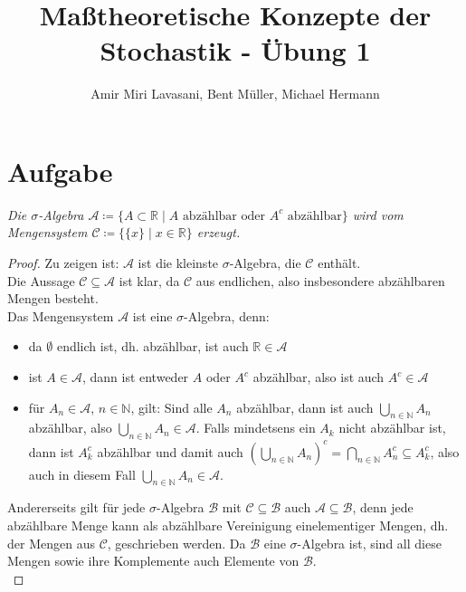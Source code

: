 \documentclass[11pt]{amsart}
\title{Maßtheoretische Konzepte der Stochastik - Übung 1}
\author{Amir Miri Lavasani, Bent Müller, Michael Hermann}
\begin{document}
\maketitle

\pagestyle{empty}

\section{Aufgabe}
\thispagestyle{empty}
\textit{Die $\sigma$-Algebra $\mathcal{A} \coloneqq \{A \subset \mathbb{R} \;|\; A \text{ abzählbar oder } A^c \text{ abzählbar}\}$ wird vom Mengensystem  $\mathcal{C} \coloneqq  \{\{x\} \;|\; x \in \mathbb{R}\}$ erzeugt.}
\begin{proof}
Zu zeigen ist: $\mathcal{A}$ ist die kleinste $\sigma$-Algebra, die $\mathcal{C}$ enthält. \\
Die Aussage $\mathcal{C} \subseteq \mathcal{A}$ ist klar, da $\mathcal{C}$ aus endlichen, also insbesondere abzählbaren Mengen besteht. \\
Das Mengensystem $\mathcal{A}$ ist eine $\sigma$-Algebra, denn:
\begin{itemize}
\item da $\emptyset$ endlich ist, dh. abzählbar, ist auch $\mathbb{R} \in \mathcal{A}$
\item ist $A \in \mathcal{A}$, dann ist entweder $A$ oder $A^c$ abzählbar, also ist auch $A^c \in \mathcal{A}$
\item für $A_n \in \mathcal{A}$, $n \in \mathbb{N}$, gilt: Sind alle $A_n$ abzählbar, dann ist auch $\bigcup_{n \in \mathbb{N}} A_n$ abzählbar, also $\bigcup_{n \in \mathbb{N}} A_n \in \mathcal{A}$. Falls mindetsens ein $A_k$ nicht abzählbar ist, dann ist $A_k^c$ abzählbar und damit auch $(\bigcup_{n \in \mathbb{N}} A_n)^c = \bigcap_{n \in \mathbb{N}} A_n^c \subseteq A_k^c$, also auch in diesem Fall $\bigcup_{n \in \mathbb{N}} A_n \in \mathcal{A}$.
\end{itemize}

Andererseits gilt für jede $\sigma$-Algebra $\mathcal{B}$ mit $\mathcal{C} \subseteq \mathcal{B}$ auch  $\mathcal{A} \subseteq \mathcal{B}$, denn jede abzählbare Menge kann als abzählbare Vereinigung einelementiger Mengen, dh. der Mengen aus $\mathcal{C}$, geschrieben werden. Da $\mathcal{B}$ eine $\sigma$-Algebra ist, sind all diese Mengen sowie ihre Komplemente auch Elemente von $\mathcal{B}$. \\
\end{proof} 
\end{document}
